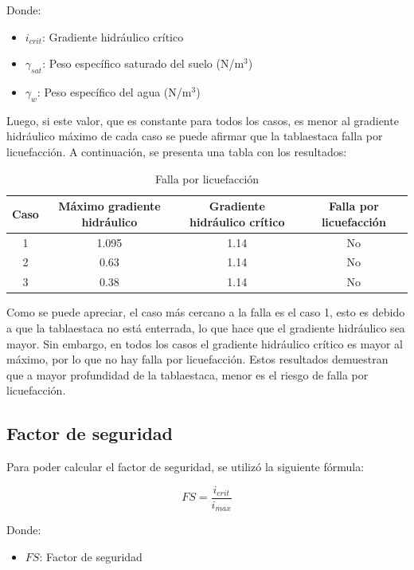 \documentclass{article}
\begin{document}
Donde:
\begin{itemize}
    \item $i_{crit}$: Gradiente hidráulico crítico
    \item $\gamma_{sat}$: Peso específico saturado del suelo (N/m$^3$)
    \item $\gamma_w$: Peso específico del agua (N/m$^3$)  
\end{itemize}
Luego, si este valor, que es constante para todos los casos, es menor al gradiente hidráulico máximo de cada caso se puede afirmar que la tablaestaca falla por licuefacción. A continuación, se presenta una tabla con los resultados:

\begin{table}[h!]
  \centering
  \begin{tabular}{cccc}
    \hline
    \textbf{Caso} & \textbf{Máximo gradiente hidráulico}& \textbf{Gradiente hidráulico crítico} &\textbf{Falla por licuefacción} \\
    \hline
    1 &1.095 & 1.14 &No \\
    2 &0.63  & 1.14 &No \\
    3 &0.38  & 1.14 &No \\
    \hline
  \end{tabular}
  \caption{Falla por licuefacción}
  \label{tab:licuefaccion}
\end{table}

Como se puede apreciar, el caso más cercano a la falla es el caso 1, esto es debido a que la tablaestaca no está enterrada, lo que hace que el gradiente hidráulico sea mayor. Sin embargo, en todos los casos el gradiente hidráulico crítico es mayor al máximo, por lo que no hay falla por licuefacción. Estos resultados demuestran que a mayor profundidad de la tablaestaca, menor es el riesgo de falla por licuefacción.

\newpage
\subsection{Factor de seguridad}
Para poder calcular el factor de seguridad, se utilizó la siguiente fórmula:

\begin{equation}
  FS = \frac{i_{crit}}{i_{max}}
\end{equation}

Donde:
\begin{itemize}
    \item $FS$: Factor de seguridad
\end{itemize}
\end{document}
